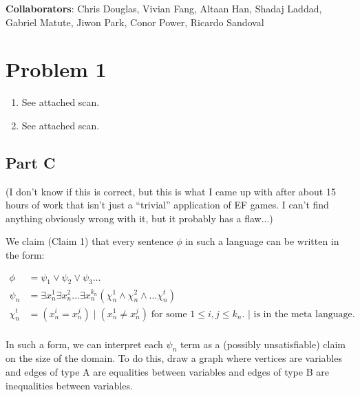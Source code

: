 \documentclass{article}
\title{\vspace{-2cm}\DocumentTitle{}}
\author{\Name{} (SID \StudentID{})}
\date{}
\begin{document}
\maketitle

\noindent\textbf{Collaborators}:
Chris Douglas,
Vivian Fang,
Altaan Han,
Shadaj Laddad,
Gabriel Matute,
Jiwon Park, \newline
Conor Power,
Ricardo Sandoval

\section{Problem 1}

\begin{enumerate}[label = {\alph*)}]
    \item See attached scan.
    \item See attached scan.
\end{enumerate}

\subsection{Part C}

(I don't know if this is correct, but this is what I came up with after about
15 hours of work that isn't just a ``trivial'' application of EF games. I can't
find anything obviously wrong with it, but it probably has a flaw...)

\bigskip

We claim (Claim 1) that every sentence $\phi$ in such a language can be written
in the form:

\newcommand{\AND}{\wedge}
\newcommand{\OR}{\vee}

\begin{align*}
    \phi &= \psi_1 \OR \psi_2 \OR \psi_3 \ldots \\
    \psi_n &= \exists x_n^1 \exists x_n^2 \ldots \exists x_n^{k_n} (\chi_n^1 \AND \chi_n^2 \AND \ldots \chi_n^t) \\
    \chi_n^t &= (x_n^i = x_n^j) \; | \; (x_n^1 \neq x_n^j) \; \text{for some $1 \leq i, j \leq k_n$. $|$ is in the meta language.} \\
\end{align*}

In such a form, we can interpret each $\psi_n$ term as a (possibly
unsatisfiable) claim on the size of the domain. To do this, draw a graph where vertices are variables and edges of type A are
equalities between variables and edges of type B are inequalities between
variables.
\end{document}
